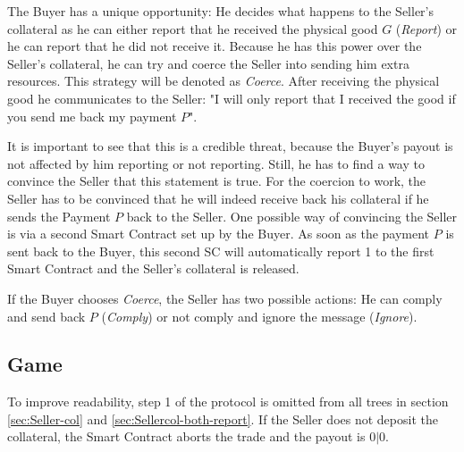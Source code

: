 \documentclass{cacthesis}
\begin{document}
The Buyer has a unique opportunity: He decides what happens to the Seller's
collateral as he can either report that he received the physical good $G$ (\emph{Report}) or he can report that he did not receive it. Because he has this power over the Seller's collateral, he can try and coerce the Seller into sending him extra resources. This strategy will be denoted as \emph{Coerce}.  After receiving the physical good he communicates to the Seller: "I will only report that I received the good if you send me back my payment $P$". \newline 

It is important to see that this is a credible threat, because the Buyer's payout is not affected by him reporting or not reporting. Still, he has to find a way to convince the Seller that this statement is true. For the coercion to work, the Seller has to be convinced that he will indeed receive back his collateral if he sends the Payment $P$ back to the Seller. One possible way of convincing the Seller is via a second Smart Contract set up by the Buyer. As soon as the payment $P$ is sent back to the Buyer, this second SC will automatically report 1 to the first Smart Contract and the Seller's collateral is released.\newline

If the Buyer chooses \emph{Coerce}, the Seller
has two possible actions: He can comply and send back $P$ (\emph{Comply}) or not comply
and ignore the message (\emph{Ignore}).

\subsection{Game}
To improve readability, step 1 of the protocol is omitted from all trees in section \ref{sec:Seller-col} and \ref{sec:Sellercol-both-report}. If the Seller does not deposit the collateral, the Smart Contract aborts the trade and the payout is $0|0$. \newline
\end{document}
